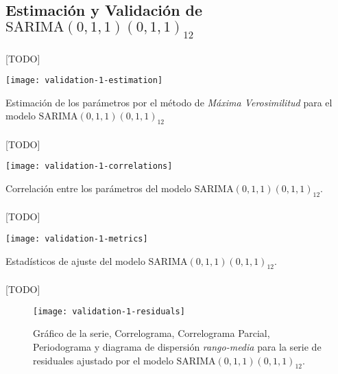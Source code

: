\documentclass[a4paper, spanish]{article}
\begin{document}
    \subsection{Estimación y Validación de \textbf{$\text{SARIMA}(0, 1, 1)(0, 1, 1)_{12}$}}
    \label{sec:fitting_1}

      \paragraph{}
      [TODO]

      \begin{table}[htb!]
        \centering
        \texttt{[image: validation-1-estimation]}
        \caption{Estimación de los parámetros por el método de \emph{Máxima Verosimilitud} para el modelo $\text{SARIMA}(0, 1, 1)(0, 1, 1)_{12}$}
        \label{table:validation_1_estimation}
      \end{table}

      \paragraph{}
      [TODO]

      \begin{table}[htb!]
        \centering
        \texttt{[image: validation-1-correlations]}
        \caption{Correlación entre los parámetros del modelo $\text{SARIMA}(0, 1, 1)(0, 1, 1)_{12}$.}
        \label{table:validation_1_correlations}
      \end{table}

      \paragraph{}
      [TODO]

      \begin{table}[htb!]
        \centering
        \texttt{[image: validation-1-metrics]}
        \caption{Estadísticos de ajuste del modelo $\text{SARIMA}(0, 1, 1)(0, 1, 1)_{12}$.}
        \label{img:validation_1_metrics}
      \end{table}

      \paragraph{}
      [TODO]

      \begin{figure}[htb!]
        \centering
        \texttt{[image: validation-1-residuals]}
        \caption{Gráfico de la serie, Correlograma, Correlograma Parcial, Periodograma y diagrama de dispersión \emph{rango-media} para la serie de residuales ajustado por el modelo $\text{SARIMA}(0, 1, 1)(0, 1, 1)_{12}$.}
        \label{fig:validation_1_residuals}
      \end{figure}
\end{document}
